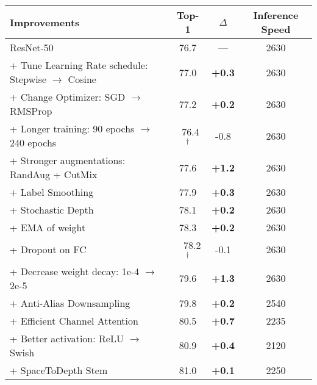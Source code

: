 \newcommand{\improvement}[1]{\textcolor{blue}{#1}}
\newcommand{\decrease}[1]{\textcolor{red}{#1}}
\newcommand{\improvementb}[1]{\textbf{#1}}
\newcommand{\decreaseb}[1]{#1}
\begin{table}[ht!]
    \begin{center}
    \small
    \begin{tabular}{l|cc|c}
      \toprule
      Improvements & Top-1 & $\Delta$  & Inference Speed\\
      \hline
      \hline
      ResNet-50 & 76.7 & --- & 2630\\
      \rowcolor{blue!15}
      + Tune Learning Rate schedule: Stepwise $\rightarrow$ Cosine & 77.0 & \improvementb{+0.3} & 2630\\
      \rowcolor{blue!15}
      + Change Optimizer: SGD $\rightarrow$ RMSProp & 77.2 & \improvementb{+0.2} & 2630\\
      \rowcolor{blue!15}
      + Longer training: 90 epochs $\rightarrow$ 240 epochs& $\;\;$76.4 $^\dag$ & \decreaseb{-0.8} & 2630 \\
      \rowcolor{green!20}
      + Stronger augmentations: RandAug + CutMix & 77.6 & \improvementb{+1.2} & 2630\\
      \rowcolor{green!20}
      + Label Smoothing & 77.9 & \improvementb{+0.3} & 2630\\
      \rowcolor{green!20}
      + Stochastic Depth & 78.1 & \improvementb{+0.2} & 2630\\
      \rowcolor{green!20}
      + EMA of weight & 78.3 & \improvementb{+0.2} & 2630\\
      \rowcolor{green!20}
      + Dropout on FC & $\;\;$ 78.2 $^\dagger$ & \decreaseb{-0.1} & 2630\\
      \rowcolor{green!20}
      + Decrease weight decay: 1e-4 $\rightarrow$ 2e-5 & 79.6 & \improvementb{+1.3} & 2630\\
      \rowcolor{yellow!20}
      + Anti-Alias Downsampling & 79.8 & \improvementb{+0.2} & 2540 \\
      \rowcolor{yellow!20}
      + Efficient Channel Attention & 80.5 & \improvementb{+0.7} & 2235 \\
      \rowcolor{yellow!20}
      + Better activation: ReLU $\rightarrow$ Swish & 80.9 & \improvementb{+0.4} & 2120 \\
      \rowcolor{yellow!20}
      + SpaceToDepth Stem & 81.0 & \improvementb{+0.1} & 2250 \\

\end{tabular}
\end{center}
\end{table}
